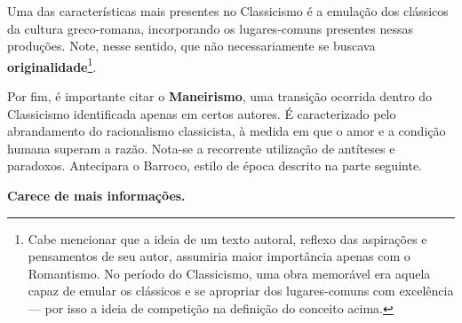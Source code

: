Uma das características mais presentes no Classicismo é a emulação dos clássicos da cultura greco-romana, incorporando os lugares-comuns presentes nessas produções. Note, nesse sentido, que não necessariamente se buscava \textbf{originalidade}\footnote{Cabe mencionar que a ideia de um texto autoral, reflexo das aspirações e pensamentos de seu autor, assumiria maior importância apenas com o Romantismo. No período do Classicismo, uma obra memorável era aquela capaz de emular os clássicos e se apropriar dos lugares-comuns com excelência — por isso a ideia de competição na definição do conceito acima.}.

Por fim, é importante citar o \textbf{Maneirismo}, uma transição ocorrida dentro do Classicismo identificada apenas em certos autores. É caracterizado pelo abrandamento do racionalismo classicista, à medida em que o amor e a condição humana superam a razão. Nota-se a recorrente utilização de antíteses e paradoxos. Antecipara o Barroco, estilo de época descrito na parte seguinte.

\textbf{Carece de mais informações.}